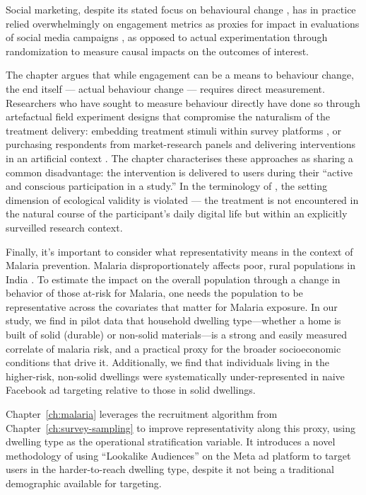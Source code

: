 Social marketing, despite its stated focus on behavioural change \citep{andreasen1994social}, has in practice relied overwhelmingly on engagement metrics as proxies for impact in evaluations of social media campaigns \citep{Shawky2019}, as opposed to actual experimentation through randomization to measure causal impacts on the outcomes of interest. 

The chapter argues that while engagement can be a means to behaviour change, the end itself --- actual behaviour change --- requires direct measurement. Researchers who have sought to measure behaviour directly have done so through artefactual field experiment designs that compromise the naturalism of the treatment delivery: embedding treatment stimuli within survey platforms \citep{Henry2020,Donati2020}, or purchasing respondents from market-research panels and delivering interventions in an artificial context \citep{Evans2021}. The chapter characterises these approaches as sharing a common disadvantage: the intervention is delivered to users during their ``active and conscious participation in a study.'' In the terminology of \citet{Schmuckler2001}, the setting dimension of ecological validity is violated --- the treatment is not encountered in the natural course of the participant's daily digital life but within an explicitly surveilled research context.

Finally, it's important to consider what representativity means in the context of Malaria prevention. Malaria disproportionately affects poor, rural populations in India \citep{Dev2004}. To estimate the impact on the overall population through a change in behavior of those at-risk for Malaria, one needs the population to be representative across the covariates that matter for Malaria exposure. In our study, we find in pilot data that household dwelling type---whether a home is built of solid (durable) or non-solid materials---is a strong and easily measured correlate of malaria risk, and a practical proxy for the broader socioeconomic conditions that drive it. Additionally, we find that individuals living in the higher-risk, non-solid dwellings were systematically under-represented in naive Facebook ad targeting relative to those in solid dwellings.

Chapter~\ref{ch:malaria} leverages the recruitment algorithm from Chapter~\ref{ch:survey-sampling} to improve representativity along this proxy, using dwelling type as the operational stratification variable. It introduces a novel methodology of using ``Lookalike Audiences'' on the Meta ad platform to target users in the harder-to-reach dwelling type, despite it not being a traditional demographic available for targeting.

